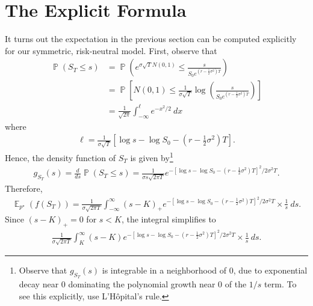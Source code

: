 \documentclass[12pt]{amsbook}
\DeclareMathOperator{\ex}{\mathbb{E}}
\DeclareMathOperator{\prob}{\mathbb{P}}
\theoremstyle{plain}
\theoremstyle{definition}
\theoremstyle{remark}
\numberwithin{equation}{section}  %
\begin{document}
\section{The Explicit Formula}
It turns out the expectation in the previous section can be computed explicitly
for our symmetric, risk-neutral model. First, observe that
\begin{equation*}
	\begin{split}
		\prob(S_{T} \le s)
		& = \prob \left (e^{\sigma \sqrt{T}N(0,1)} \le
		\frac{s}{S_{0}e^{(r- \frac{1}{2} \sigma^{2})T}} \right )
		\\
		& = \prob \left [N(0,1) \le \frac{1}{\sigma \sqrt{T}} \log\left(
		\frac{s}{S_{0} e^{(r - \frac{1}{2}\sigma^{2})T}} \right) \right ]
		\\
		& = \frac{1}{\sqrt{2 \pi}}  \int_{-\infty}^{ \ell}
		e^{- x^{2}/2} \ dx
	\end{split}
\end{equation*}
where
\begin{equation*}
	\begin{split}
		\ell = \frac{1}{\sigma \sqrt{T}}
		\left [ \log s - \log S_{0} - (r - \frac{1}{2} \sigma^{2})T \right ].
	\end{split}
\end{equation*}
Hence, the density function of $S_{T}$ is given by\footnote{Observe that $g_{S_{T}}(s)$ is integrable in a neighborhood of $0$, due
to exponential decay near $0$ dominating the polynomial growth near $0$
of the $1/s$ term. To see this explicitly, use L'H{\^o}pital's rule.} 
\begin{equation*}
	\begin{split}
		g_{S_{T}}(s) = \frac{d}{ds} \prob (S_{T} \le s)
		= \frac{1}{\sigma s \sqrt{2 \pi T}}
		e^{- \left[ \log s - \log S_{0} - (r - \frac{1}{2}
		\sigma^{2})T \right]^{2}/2 \sigma^{2} T}.
	\end{split}
\end{equation*}
Therefore,
\begin{equation*}
	\begin{split}
		\ex_{p^{\star}}(f(S_{T})) = 
		\frac{1}{\sigma \sqrt{2 \pi T}} \int_{-\infty}^{\infty}{(s- K)}_{+}
		e^{- \left[ \log s - \log S_{0} - (r - \frac{1}{2}
		\sigma^{2})T \right]^{2}/2 \sigma^{2} T}
		\times \frac{1}{s}  \ ds.
	\end{split}
\end{equation*}
Since ${(s-K)}_{+} = 0$ for $s < K$, the integral simplifies to
\begin{equation*}
	\begin{split}
		\frac{1}{\sigma \sqrt{2 \pi T}} \int_{K}^{\infty}{(s- K)}
		e^{- \left[ \log s - \log S_{0} - (r - \frac{1}{2}
		\sigma^{2})T \right]^{2}/2 \sigma^{2} T} \times \frac{1}{s}  \ ds.
	\end{split}
\end{equation*}
\end{document}

